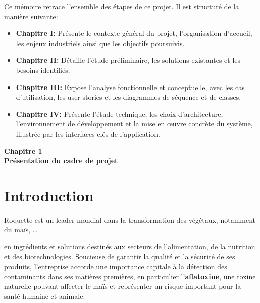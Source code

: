 \documentclass[12pt,a4paper]{report}
\begin{document}
\medskip
\noindent
Ce mémoire retrace l’ensemble des étapes de ce projet. Il est structuré de la manière suivante:
\begin{itemize}
    \item \textbf{Chapitre I:} Présente le contexte général du projet, l’organisation d’accueil, les enjeux industriels ainsi que les objectifs poursuivis.
    \item \textbf{Chapitre II:} Détaille l’étude préliminaire, les solutions existantes et les besoins identifiés.
    \item \textbf{Chapitre III:} Expose l’analyse fonctionnelle et conceptuelle, avec les cas d’utilisation, les user stories et les diagrammes de séquence et de classes.
    \item \textbf{Chapitre IV:} Présente l’étude technique, les choix d’architecture, l’environnement de développement et la mise en œuvre concrète du système, illustrée par les interfaces clés de l’application.
\end{itemize}
\cleardoublepage
\thispagestyle{empty}
\begin{center}
    \vspace*{4cm}
    {\Huge \textbf{Chapitre 1}}\\[1.5cm]
    {\LARGE \textbf{Présentation du cadre de projet}}
\end{center}
\cleardoublepage

\setcounter{section}{0}



\section{Introduction}

Roquette est un leader mondial dans la transformation des végétaux, notamment du maïs, \ldots{}

en ingrédients et solutions destinés aux secteurs de l’alimentation, de la nutrition et des biotechnologies.
Soucieuse de garantir la qualité et la sécurité de ses produits, l’entreprise accorde une importance capitale
à la détection des contaminants dans ses matières premières, en particulier l’\textbf{aflatoxine},
une toxine naturelle pouvant affecter le maïs et représenter un risque important pour la santé humaine et animale.
\end{document}
